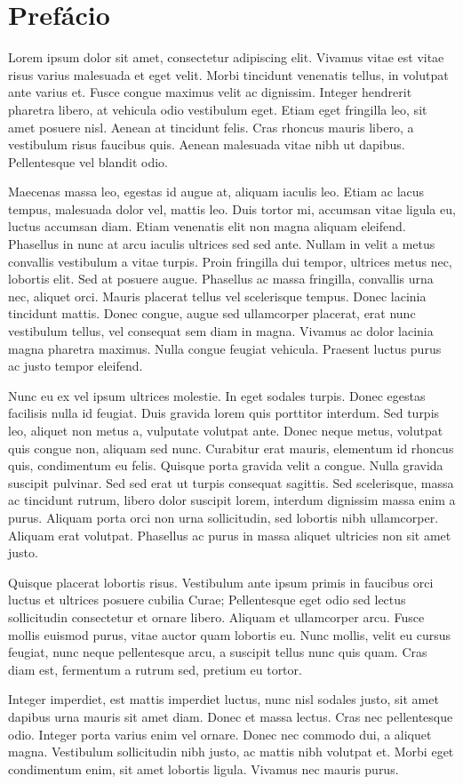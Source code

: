 \chapter*{Prefácio}

Lorem ipsum dolor sit amet, consectetur adipiscing elit. Vivamus vitae est vitae risus varius malesuada et eget velit. Morbi tincidunt venenatis tellus, in volutpat ante varius et. Fusce congue maximus velit ac dignissim. Integer hendrerit pharetra libero, at vehicula odio vestibulum eget. Etiam eget fringilla leo, sit amet posuere nisl. Aenean at tincidunt felis. Cras rhoncus mauris libero, a vestibulum risus faucibus quis. Aenean malesuada vitae nibh ut dapibus. Pellentesque vel blandit odio.

Maecenas massa leo, egestas id augue at, aliquam iaculis leo. Etiam ac lacus tempus, malesuada dolor vel, mattis leo. Duis tortor mi, accumsan vitae ligula eu, luctus accumsan diam. Etiam venenatis elit non magna aliquam eleifend. Phasellus in nunc at arcu iaculis ultrices sed sed ante. Nullam in velit a metus convallis vestibulum a vitae turpis. Proin fringilla dui tempor, ultrices metus nec, lobortis elit. Sed at posuere augue. Phasellus ac massa fringilla, convallis urna nec, aliquet orci. Mauris placerat tellus vel scelerisque tempus. Donec lacinia tincidunt mattis. Donec congue, augue sed ullamcorper placerat, erat nunc vestibulum tellus, vel consequat sem diam in magna. Vivamus ac dolor lacinia magna pharetra maximus. Nulla congue feugiat vehicula. Praesent luctus purus ac justo tempor eleifend.

Nunc eu ex vel ipsum ultrices molestie. In eget sodales turpis. Donec egestas facilisis nulla id feugiat. Duis gravida lorem quis porttitor interdum. Sed turpis leo, aliquet non metus a, vulputate volutpat ante. Donec neque metus, volutpat quis congue non, aliquam sed nunc. Curabitur erat mauris, elementum id rhoncus quis, condimentum eu felis. Quisque porta gravida velit a congue. Nulla gravida suscipit pulvinar. Sed sed erat ut turpis consequat sagittis. Sed scelerisque, massa ac tincidunt rutrum, libero dolor suscipit lorem, interdum dignissim massa enim a purus. Aliquam porta orci non urna sollicitudin, sed lobortis nibh ullamcorper. Aliquam erat volutpat. Phasellus ac purus in massa aliquet ultricies non sit amet justo.

Quisque placerat lobortis risus. Vestibulum ante ipsum primis in faucibus orci luctus et ultrices posuere cubilia Curae; Pellentesque eget odio sed lectus sollicitudin consectetur et ornare libero. Aliquam et ullamcorper arcu. Fusce mollis euismod purus, vitae auctor quam lobortis eu. Nunc mollis, velit eu cursus feugiat, nunc neque pellentesque arcu, a suscipit tellus nunc quis quam. Cras diam est, fermentum a rutrum sed, pretium eu tortor.

Integer imperdiet, est mattis imperdiet luctus, nunc nisl sodales justo, sit amet dapibus urna mauris sit amet diam. Donec et massa lectus. Cras nec pellentesque odio. Integer porta varius enim vel ornare. Donec nec commodo dui, a aliquet magna. Vestibulum sollicitudin nibh justo, ac mattis nibh volutpat et. Morbi eget condimentum enim, sit amet lobortis ligula. Vivamus nec mauris purus. 
